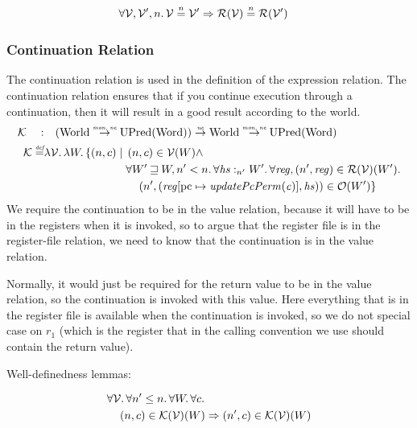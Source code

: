 \documentclass{article}
\newcommand{\update}[2]{[#1 \mapsto #2]}
\newcommand{\monnefun}{\stackrel{\textit{\tiny{mon, ne}}}{\rightarrow}}
\newcommand{\nefun}{\stackrel{\textit{\tiny{ne}}}{\rightarrow}}
\newcommand{\defeq}{\stackrel{\textit{\tiny{def}}}{=}}
\newcommand{\nequal}[1][n]{\stackrel{\tiny{#1}}{=}}
\newcommand{\var}[1]{\mathit{#1}}
\newcommand{\hs}{\var{hs}}
\newcommand{\pcreg}{\mathrm{pc}}
\newcommand{\reg}{\var{reg}}
\newcommand{\heap}{\var{heap}}
\newcommand{\plainfun}[2]{
  \ifthenelse{\equal{#2}{}}
             {\mathit{#1}}
             {\mathit{#1}(#2)}
}
\newcommand{\updatePcPerm}[1]{\plainfun{updatePcPerm}{#1}}
\newcommand{\future}{\mathbin{\sqsupseteq}}
\newcommand{\heapSat}[3][\heap]{#1 :_{#2} #3}
\newcommand{\asmType}{\plaindom{AsmType}}
\newcommand{\plaindom}[1]{\mathrm{#1}}
\newcommand{\Words}{\plaindom{Word}}
\newcommand{\Worlds}{\plaindom{World}}
\newcommand{\UPred}[1]{\plaindom{UPred}(#1)}
\newcommand{\intr}[2]{\mathcal{#1}}
\newcommand{\valueintr}[1]{\intr{V}{#1}}
\newcommand{\contintr}[1]{\intr{K}{#1}}
\newcommand{\regintr}[1]{\intr{R}{#1}}
\newcommand{\stdvr}{\valueintr{\asmType}}
\newcommand{\stdrr}{\regintr{\asmType}}
\newcommand{\stdkr}{\contintr{\asmType}}
\newcommand{\observations}{\mathcal{O}}
\newcommand{\npair}[2][n]{\left(#1,#2 \right)}
\begin{document}
\begin{lemma}
\label{lem:reg-ne-vr}
\begin{align*}
  &\forall \stdvr, \stdvr', n \ldotp \stdvr \nequal \stdvr' \Rightarrow \stdrr(\stdvr) \nequal \stdrr(\stdvr')
\end{align*}
\end{lemma}

\subsubsection{Continuation Relation}
\label{subsubsec:continuation-relation}
The continuation relation is used in the definition of the expression relation. The continuation relation ensures that if you continue execution through a continuation, then it will result in a good result according to the world.
\begin{align*}
  \stdkr \quad : & \quad (\Worlds \monnefun \UPred{\Words}) \nefun \Worlds \monnefun \UPred{\Words} \\
  \stdkr \defeq & \lambda \stdvr \ldotp \lambda W \ldotp\{ \npair{c} \mid
                     \begin{aligned}[t]
                       & \npair{c} \in \stdvr(W) \land \\
                       &  \forall W' \future W, n' < n\ldotp %
                       \forall \heapSat[\hs]{n'}{W'} \ldotp \forall \reg, \npair[n']{\reg} \in \stdrr(\stdvr)(W') \ldotp \\
                       & \quad \npair[n']{(\reg\update{\pcreg}{\updatePcPerm{\var{c}}},\hs)} \in \observations(W') \}
                 \end{aligned}
\end{align*}
We require the continuation to be in the value relation, because it will have to be in the registers when it is invoked, so to argue that the register file is in the register-file relation, we need to know that the continuation is in the value relation.

Normally, it would just be required for the return value to be in the value relation, so the continuation is invoked with this value. Here everything that is in the register file is available when the continuation is invoked, so we do not special case on $r_1$ (which is the register that in the calling convention we use should contain the return value). 


Well-definedness lemmas:
\begin{lemma}
\label{lem:stdkr-dc}
  \begin{align*}
    &\forall \stdvr \ldotp \forall n' \leq n \ldotp \forall W \ldotp \forall c \ldotp\\
    &\quad \npair{c} \in \stdkr(\stdvr)(W) \Rightarrow \npair[n']{c} \in \stdkr(\stdvr)(W)
  \end{align*}
\end{lemma}
\end{document}
